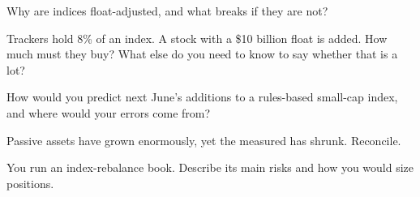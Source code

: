 \begin{interviewq}\label{iq:m1:index-construction-and-rebalancing:2}
Why are indices float-adjusted, and what breaks if they are not?
\end{interviewq}

\begin{interviewq}\label{iq:m1:index-construction-and-rebalancing:3}
Trackers hold 8\% of an index. A stock with a \$10 billion float is added.
How much must they buy? What else do you need to know to say whether that is
a lot?
\end{interviewq}

\begin{interviewq}\label{iq:m1:index-construction-and-rebalancing:4}
How would you predict next June's additions to a rules-based small-cap index,
and where would your errors come from?
\end{interviewq}

\begin{interviewq}\label{iq:m1:index-construction-and-rebalancing:5}
Passive assets have grown enormously, yet the measured  has
shrunk. Reconcile.
\end{interviewq}

\begin{interviewq}\label{iq:m1:index-construction-and-rebalancing:6}
You run an index-rebalance book. Describe its main risks and how you would
size positions.
\end{interviewq}
